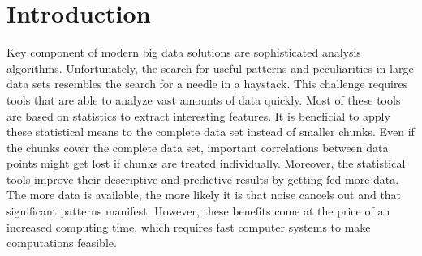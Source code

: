 \section{Introduction}

Key component of modern big data solutions are sophisticated analysis algorithms.%
Unfortunately, the search for useful patterns and peculiarities in large data sets resembles the search for a needle in a haystack. 
This challenge requires tools that are able to analyze vast amounts of data quickly. 
Most of these tools are based on statistics to extract interesting features. 
It is beneficial to apply these statistical means to the complete data set instead of smaller chunks. 
Even if the chunks cover the complete data set, important correlations between data points might get lost if chunks are treated individually. 
Moreover, the statistical tools improve their descriptive and predictive results by getting fed more data. 
The more data is available, the more likely it is that noise cancels out and that significant patterns manifest. 
However, these benefits come at the price of an increased computing time, which requires fast computer systems to make computations feasible. 
